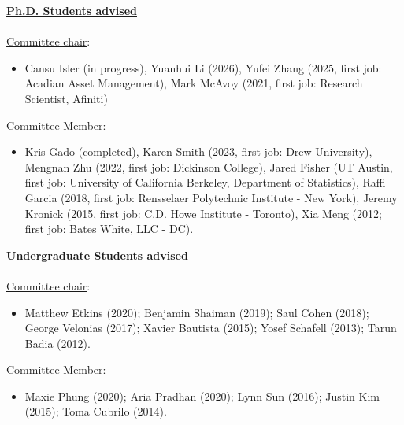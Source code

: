 \documentclass[12pt]{article}
\begin{document}
\underline{\textbf{Ph.D. Students advised}} \\ \\
\underline{Committee chair}: 
\begin{itemize}
	\item Cansu Isler (in progress), Yuanhui Li (2026), Yufei Zhang (2025, first job: Acadian Asset Management), Mark McAvoy (2021, first job: Research Scientist, Afiniti)
\end{itemize}	
\underline{Committee Member}: 
\begin{itemize}
	\item Kris Gado (completed), Karen Smith (2023, first job: Drew University), Mengnan Zhu (2022, first job:  Dickinson College), Jared Fisher (UT Austin, first job: University of California Berkeley, Department of Statistics), Raffi Garcia  (2018, first job: Rensselaer Polytechnic Institute - New York), Jeremy Kronick (2015, first job: C.D. Howe Institute - Toronto), Xia Meng (2012; first job: Bates White, LLC - DC). 
\end{itemize}
\underline{\textbf{Undergraduate Students advised}} \\ \\
\underline{Committee chair}: 
\begin{itemize}
	\item Matthew Etkins (2020); Benjamin Shaiman (2019); Saul Cohen (2018); George Velonias (2017); Xavier Bautista (2015); Yosef Schafell (2013); Tarun Badia (2012). 
\end{itemize}
\underline{Committee Member}: 
\begin{itemize}
	\item Maxie Phung (2020); Aria Pradhan (2020); Lynn Sun (2016); Justin Kim (2015); Toma Cubrilo (2014).
\end{itemize}
\end{document}
